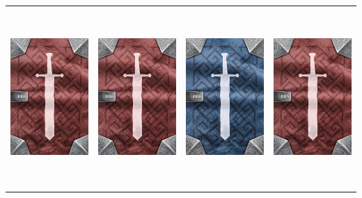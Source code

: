 \documentclass{minimal}
\begin{document}
{\begin{longtable}{llll}
\includegraphics[width=44mm,height=68mm]{./64-151/gh-086b-wand-of-tremors-back.png} &
\includegraphics[width=44mm,height=68mm]{./64-151/gh-086b-wand-of-tremors-back.png} &
\includegraphics[width=44mm,height=68mm]{./64-151/gh-086a-wand-of-tremors-back.png} &
\includegraphics[width=44mm,height=68mm]{./64-151/gh-085b-wand-of-infernos-back.png}\\ 

\end{longtable}}
\end{document}
